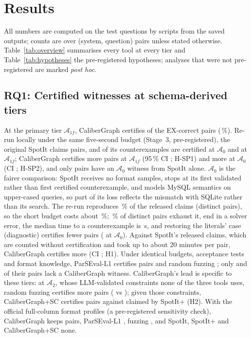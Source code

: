 \section{Results}\label{sec:results}

All numbers are computed on the test questions by scripts from the saved outputs; counts are over (system, question) pairs unless stated otherwise. Table~\ref{tab:overview} summarises every tool at every tier and Table~\ref{tab:hypotheses} the pre-registered hypotheses; analyses that were not pre-registered are marked \emph{post hoc}.




\subsection{RQ1: Certified witnesses at schema-derived tiers}\label{sec:main}
At the primary tier $\mathcal A_{1f}$, CaliberGraph certifies  of the  EX-correct pairs (\,\%). Re-run locally under the same five-second budget (Stage~3, pre-registered), the original SpotIt claims  pairs, and  of its counterexamples are certified at $\mathcal A_0$ and  at $\mathcal A_{1f}$; CaliberGraph certifies  more pairs at $\mathcal A_{1f}$ (95\,\% CI ; H-SP1) and  more at $\mathcal A_0$ (CI ; H-SP2), and only  pairs have an $\mathcal A_0$ witness from SpotIt alone. $\mathcal A_0$ is the fairer comparison: SpotIt receives no format samples, stops at its first validated rather than first certified counterexample, and models MySQL semantics on upper-cased queries, so part of its loss reflects the mismatch with SQLite rather than its search. The re-run reproduces \,\% of the released claims (distinct pairs), so the short budget costs about \,\%; \,\% of distinct pairs exhaust it,  end in a solver error, the median time to a counterexample is \,s, and restoring the literals' case (diagnostic) certifies fewer pairs ( at $\mathcal A_0$). Against SpotIt's released claims, which are counted without certification and took up to about 20 minutes per pair, CaliberGraph certifies  more (CI ; H1). Under identical budgets, acceptance tests and format knowledge, ParSEval-L1 certifies  pairs and random fuzzing ; only  and  of their pairs lack a CaliberGraph witness. CaliberGraph's lead is specific to these tiers: at $\mathcal A_2$, whose LLM-validated constraints none of the three tools uses, random fuzzing certifies more pairs ( vs ); given those constraints, CaliberGraph+SC certifies  pairs against  claimed by SpotIt+ (H2). With the official full-column format profiles (a pre-registered sensitivity check), CaliberGraph keeps  pairs, ParSEval-L1 , fuzzing , and SpotIt, SpotIt+ and CaliberGraph+SC none.

